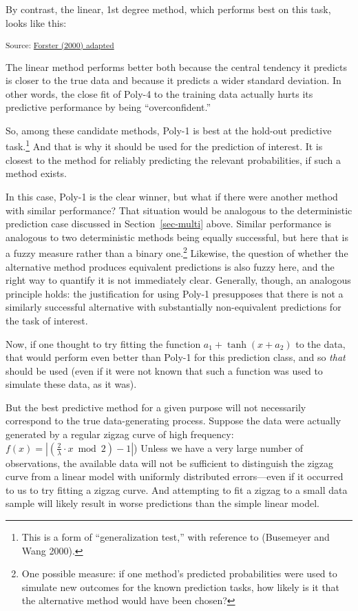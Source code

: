 \documentclass[
  letterpaper,
  DIV=11,
  numbers=noendperiod]{scrartcl}
\theoremstyle{definition}
\theoremstyle{remark}
\begin{document}
By contrast, the linear, 1st degree method, which performs best on this
task, looks like this:

\textsubscript{Source:
\href{https://hugetim.github.io/justify-predictive/notebooks/forster2000_adapted-preview.html\#cell-fig-poly1-eval}{Forster
(2000) adapted}}

The linear method performs better both because the central tendency it
predicts is closer to the true data and because it predicts a wider
standard deviation. In other words, the close fit of Poly-4 to the
training data actually hurts its predictive performance by being
``overconfident.''

So, among these candidate methods, Poly-1 is best at the hold-out
predictive task.\footnote{This is a form of ``generalization test,''
  with reference to (Busemeyer and Wang 2000).} And that is why it
should be used for the prediction of interest. It is closest to the
method for reliably predicting the relevant probabilities, if such a
method exists.

In this case, Poly-1 is the clear winner, but what if there were another
method with similar performance? That situation would be analogous to
the deterministic prediction case discussed in Section~\ref{sec-multi}
above. Similar performance is analogous to two deterministic methods
being equally successful, but here that is a fuzzy measure rather than a
binary one.\footnote{One possible measure: if one method's predicted
  probabilities were used to simulate new outcomes for the known
  prediction tasks, how likely is it that the alternative method would
  have been chosen?} Likewise, the question of whether the alternative
method produces equivalent predictions is also fuzzy here, and the right
way to quantify it is not immediately clear. Generally, though, an
analogous principle holds: the justification for using Poly-1
presupposes that there is not a similarly successful alternative with
substantially non-equivalent predictions for the task of interest.

Now, if one thought to try fitting the function
\(a_1 + \tanh (x + a_2)\) to the data, that would perform even better
than Poly-1 for this prediction class, and so \emph{that} should be used
(even if it were not known that such a function was used to simulate
these data, as it was).

But the best predictive method for a given purpose will not necessarily
correspond to the true data-generating process. Suppose the data were
actually generated by a regular zigzag curve of high frequency:
\(f(x) = \left| \left( \frac{2}{\lambda} \cdot x \bmod 2 \right) - 1 \right|\))
Unless we have a very large number of observations, the available data
will not be sufficient to distinguish the zigzag curve from a linear
model with uniformly distributed errors---even if it occurred to us to
try fitting a zigzag curve. And attempting to fit a zigzag to a small
data sample will likely result in worse predictions than the simple
linear model.
\end{document}
